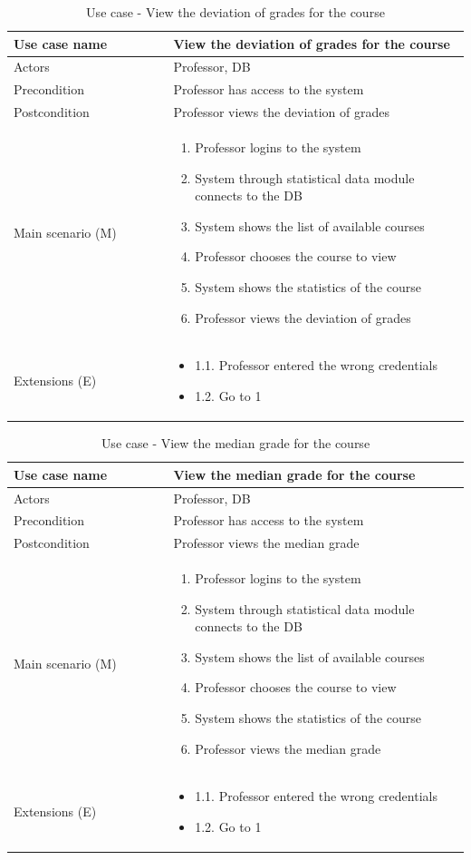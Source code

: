 \documentclass[12pt]{article}
\newcommand\tabularhead[1]{
\begin{table}[h]
  \caption{Use case - #1}
  \begin{tabular}{|p{0.35\linewidth}|p{0.65\linewidth}|}
    \hline
    \textbf{Use case name} & \textbf{#1} \\
    \hline}
\newcommand\addrow[2]{#1 &#2\\ \hline}
\newcommand\adddoublerow[2]{\begin{minipage}[t][][t]{2.5cm}#1\end{minipage}%
    &\begin{minipage}[t][][t]{\linewidth}
     \begin{itemize}\setlength{\itemsep}{0pt}%
        #2     
     \end{itemize}
     \end{minipage}\\ \hline}
\newcommand\addmulrow[2]{ \begin{minipage}[t][][t]{2.5cm}#1\end{minipage}%
     &\begin{minipage}[t][][t]{\linewidth}
      \begin{enumerate}\setlength{\itemsep}{0pt}%
        #2   
      \end{enumerate}
      \end{minipage}\\ \hline}
\newenvironment{usecase}{\tabularhead}
{\hline\end{tabular}\end{table}}
\begin{document}
\begin{usecase}{View the deviation of grades for the course}
    \addrow{Actors}{Professor, DB}
    \addrow{Precondition}{Professor has access to the system}
    \addrow{Postcondition}{Professor views the deviation of grades}
    \addmulrow{Main scenario (M)}{
        \item Professor logins to the system
        \item System through statistical data module connects to the DB
        \item System shows the list of available courses
        \item Professor chooses the course to view
        \item System shows the statistics of the course
        \item Professor views the deviation of grades
    }
    \adddoublerow{Extensions (E)}{
        \item[] 1.1. Professor entered the wrong credentials
        \item[] 1.2. Go to 1
    }
\end{usecase}
\newpage
\begin{usecase}{View the median grade for the course}
    \addrow{Actors}{Professor, DB}
    \addrow{Precondition}{Professor has access to the system}
    \addrow{Postcondition}{Professor views the median grade}
    \addmulrow{Main scenario (M)}{
        \item Professor logins to the system
        \item System through statistical data module connects to the DB
        \item System shows the list of available courses
        \item Professor chooses the course to view
        \item System shows the statistics of the course
        \item Professor views the median grade
    }
    \adddoublerow{Extensions (E)}{
        \item[] 1.1. Professor entered the wrong credentials
        \item[] 1.2. Go to 1
    }
\end{usecase}
\end{document}

